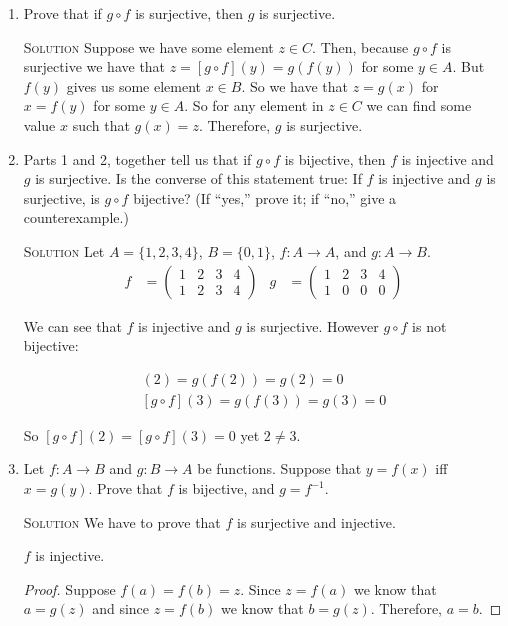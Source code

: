 \documentclass[twoside]{amsart}
\newcommand{\solution}{\textsc{Solution}\xspace}
\newcommand{\gOff}{\ensuremath{g \circ f}\xspace}
\begin{document}
\begin{enumerate}[A.]
\begin{enumerate}[1]
      \item Prove that if \gOff is surjective, then $g$ is surjective.

      \solution Suppose we have some element $z\in C$. Then, because
      \gOff is surjective we have that $z = [g \circ f](y)=g(f(y))$ for some
      $y \in A$. But $f(y)$ gives us some element $x \in B$. So we have
      that $z=g(x)$ for $x=f(y)$ for some $y\in A$. So for any element
      in $z \in C$ we can find some value $x$ such that $g(x)=z$. Therefore,
      $g$ is surjective.
      
      \item Parts 1 and 2, together tell us that if \gOff is bijective,
      then $f$ is injective and $g$ is surjective. Is the converse of this
      statement true: If $f$ is injective and $g$ is surjective,
      is \gOff bijective? (If ``yes,'' prove it; if ``no,'' give
      a counterexample.)

      \solution Let $A=\{1,2,3,4\}$, $B=\{0,1\}$, $f:A \to A$, and
      $g:A \to B$.
      \begin{align*}
         f &= \begin{pmatrix}
	       1 & 2 & 3 & 4\\
	       1 & 2 & 3 & 4
              \end{pmatrix}
	      &
	 g &= \begin{pmatrix}
	       1 & 2 & 3 & 4\\
	       1 & 0 & 0 & 0
	      \end{pmatrix}
      \end{align*}

      We can see that $f$ is injective and $g$ is surjective. However
      $g \circ f$ is not bijective:

      \begin{gather*}
         [g \circ f](2) = g(f(2)) = g(2) = 0 \\
	 [g \circ f](3) = g(f(3)) = g(3) = 0
      \end{gather*}

      So $[g \circ f](2) = [g \circ f](3) = 0$ yet $2 \ne 3$.

      \item Let $f : A \to B$ and $g : B \to A$ be functions. Suppose
      that $y=f(x)$ iff $x=g(y)$. Prove that $f$ is bijective, and
      $g = f^{-1}$.

      \solution We have to prove that $f$ is surjective and injective.

      $f$ is injective.
      \begin{proof}
         Suppose $f(a)=f(b)=z$. Since $z=f(a)$ we know that $a=g(z)$ and
	 since $z=f(b)$ we know that $b=g(z)$. Therefore, $a=b$.
      \end{proof}


\end{enumerate}
\end{enumerate}
\end{document}
